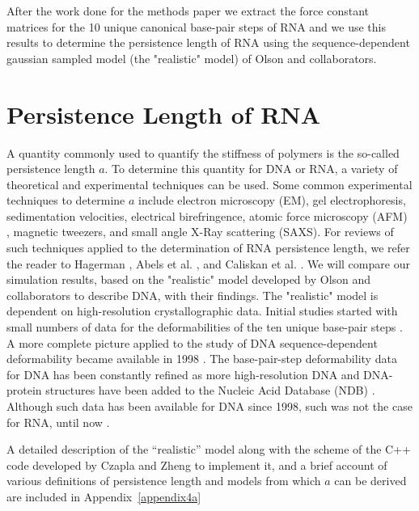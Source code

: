 After the work done for the methods paper we extract the force
constant matrices for the 10 unique canonical base-pair steps of RNA
and we use this results to determine the persistence length of RNA
using the sequence-dependent gaussian sampled model (the "realistic"
model) of Olson and collaborators.




\section{Persistence Length of RNA}
A quantity commonly used to  quantify the stiffness of polymers is the
so-called persistence  length $a$. To determine this  quantity for DNA
or RNA,  a variety of  theoretical and experimental techniques  can be
used.  Some  common experimental  techniques to determine  $a$ include
electron   microscopy   (EM),   gel   electrophoresis,   sedimentation
velocities, electrical birefringence,  atomic force microscopy (AFM) ,
magnetic  tweezers,  and small  angle  X-Ray  scattering (SAXS).   For
reviews  of  such  techniques  applied  to the  determination  of  RNA
persistence    length,    we   refer    the    reader   to    Hagerman
\cite{hagerman1997}, Abels  et al.  \cite{abels2005},  and Caliskan et
al.   \cite{caliskan2005}.  We  will compare  our  simulation results,
based on  the "realistic" model  developed by Olson  and collaborators
\cite{olson1995} to describe DNA, with their findings. The "realistic"
model is dependent  on high-resolution crystallographic data.  Initial
studies started with small numbers  of data for the deformabilities of
the  ten unique  base-pair  steps \cite{olson1995}.   A more  complete
picture applied  to the study of DNA  sequence-dependent deformability
became  available   in  1998  \cite{olson1998}.    The  base-pair-step
deformability  data  for  DNA  has  been constantly  refined  as  more
high-resolution DNA and DNA-protein  structures have been added to the
Nucleic Acid Database (NDB) \cite{balasubramanian2009}.  Although such
data has been available for DNA  since 1998, such was not the case for
RNA, until now \cite{olson2009}.

A detailed description of the  ``realistic'' model along with the scheme
of the C++  code developed by Czapla and Zheng to  implement it, and a
brief account of various  definitions of persistence length and models
from which $a$ can be derived are included in Appendix~\ref{appendix4a}





